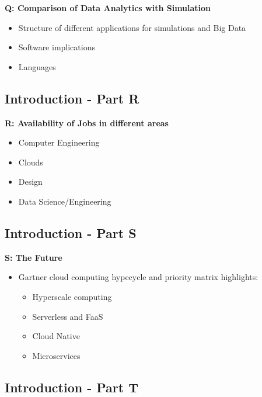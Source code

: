 \textbf{Q: Comparison of Data Analytics with Simulation}
\begin{itemize}
\item Structure of different applications for simulations and Big Data
\item Software implications
\item Languages
\end{itemize}  

\subsection{Introduction - Part R}\label{s:cloud-fundamentals-r}

\textbf{R: Availability of Jobs in different areas}
\begin{itemize}
\item Computer Engineering
\item Clouds
\item Design
\item Data Science/Engineering
\end{itemize} 

\subsection{Introduction - Part S}\label{s:cloud-fundamentals-s}

\textbf{S: The Future}
\begin{itemize}
\item Gartner cloud computing hypecycle and priority matrix
  highlights:
\begin{itemize}
\item Hyperscale computing
\item Serverless and FaaS
\item Cloud Native
\item Microservices
\end{itemize} 
\end{itemize} 
\subsection{Introduction - Part T}\label{s:cloud-fundamentals-t} 

